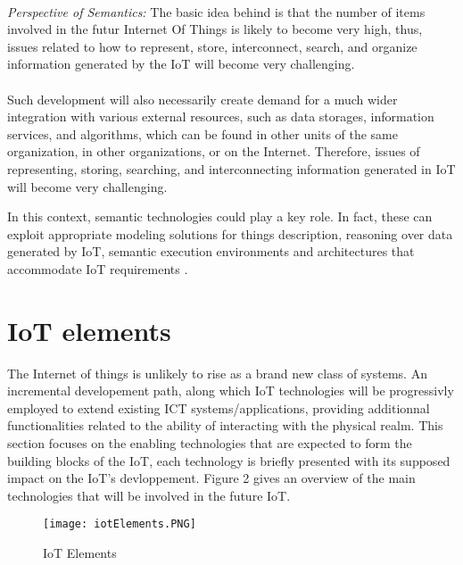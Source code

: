 \documentclass[10pt, twocolumn]{article}
\begin{document}
\paragraph{}
\emph{Perspective of Semantics: } The basic idea behind is that the number of items involved in the futur Internet Of Things is likely to become very high, thus, issues related to how to represent, store, interconnect, search, and organize information generated by the IoT will become very challenging.
\paragraph{}
Such development will also necessarily create demand for a much wider integration with various external resources,
such as data storages, information services, and algorithms, which can be found in other units of the same organization,
in other organizations, or on the Internet. Therefore, issues of representing, storing, searching, and interconnecting information generated in IoT will become very challenging.

In this context, semantic technologies could play a key role. In fact, these can exploit appropriate modeling solutions for things description, reasoning over data generated by IoT, semantic execution environments and architectures that accommodate IoT requirements \cite{ref1}.
\section{IoT elements}

The Internet of things is unlikely to rise as a brand new class of systems. An incremental developement path, along which IoT technologies will be progressivly employed to extend existing ICT systems/applications, providing additionnal functionalities related to the ability of interacting with the physical realm.
This section focuses on the enabling technologies that are expected to form the building blocks of the IoT, each technology is briefly presented with its  supposed impact on the IoT's devloppement. Figure 2 gives an overview of the main technologies that will be involved in the future IoT.
\begin{figure}
\begin{center}
\texttt{[image: iotElements.PNG]}
\end{center}
\caption{IoT Elements}
\end{figure}
\end{document}
